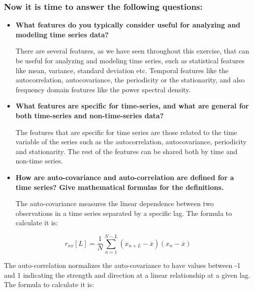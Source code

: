 \documentclass{article}
\begin{document}
\subsubsection*{Now it is
 time to answer the following questions:}
 \begin{itemize}
     \item \textbf{What features do you typically consider useful for analyzing and modeling time series data?}
     
     
     There are several features, as we have seen throughout this exercise, that can be useful for analyzing and modeling time series, such as statistical features like mean, variance, standard deviation etc. Temporal features like the autocorrelation, autocovariance, the periodicity or the stationarity, and also frequency domain features like the power spectral density.
 \end{itemize}
  \begin{itemize}
     \item \textbf{What features are specific for time-series, and what are general for both time-series and non-time-series data?}
     
     
     The features that are specific for time series are those related to the time variable of the series such as the autocorrelation, autocovariance, periodicity and stationarity. The rest of the features can be shared both by time and non-time series.
 \end{itemize}
  \begin{itemize}
     \item \textbf{How are auto-covariance and auto-correlation are defined for a time series? Give mathematical formulas for the definitions.}
     
     
     The auto-covariance measures the linear dependence between two observations in a time series separated by a specific lag. The formula to calculate it is:
      \end{itemize}

      
    \begin{equation}
        r_{xx}[L] = \frac{1}{N}\sum_{n=1}^{N - L} (x_{n+L} - \overline{x})(x_{n} - \overline{x})
    \end{equation}

    

The auto-correlation normalizes the auto-covariance to have values between -1 and 1 indicating the strength and direction at a linear relationship at a given lag. The formula to calculate it is:
\end{document}
